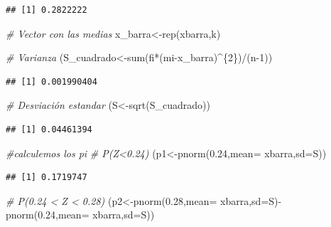 \documentclass{staprojteamusb}
\newenvironment{Shaded}{\begin{snugshade}}{\end{snugshade}}
\newcommand{\AttributeTok}[1]{\textcolor[rgb]{0.77,0.63,0.00}{#1}}
\newcommand{\CommentTok}[1]{\textcolor[rgb]{0.56,0.35,0.01}{\textit{#1}}}
\newcommand{\DecValTok}[1]{\textcolor[rgb]{0.00,0.00,0.81}{#1}}
\newcommand{\FloatTok}[1]{\textcolor[rgb]{0.00,0.00,0.81}{#1}}
\newcommand{\FunctionTok}[1]{\textcolor[rgb]{0.00,0.00,0.00}{#1}}
\newcommand{\NormalTok}[1]{#1}
\newcommand{\OtherTok}[1]{\textcolor[rgb]{0.56,0.35,0.01}{#1}}
\newcommand{\SpecialCharTok}[1]{\textcolor[rgb]{0.00,0.00,0.00}{#1}}
\begin{document}
\begin{verbatim}
## [1] 0.2822222
\end{verbatim}

\begin{Shaded}
\begin{Highlighting}[]
\CommentTok{\# Vector con las medias}
\NormalTok{x\_barra}\OtherTok{\textless{}{-}}\FunctionTok{rep}\NormalTok{(xbarra,k)}

\CommentTok{\# Varianza }
\NormalTok{(S\_cuadrado}\OtherTok{\textless{}{-}}\FunctionTok{sum}\NormalTok{(fi}\SpecialCharTok{*}\NormalTok{(mi}\SpecialCharTok{{-}}\NormalTok{x\_barra)}\SpecialCharTok{\^{}}\NormalTok{\{}\DecValTok{2}\NormalTok{\})}\SpecialCharTok{/}\NormalTok{(n}\DecValTok{{-}1}\NormalTok{))}
\end{Highlighting}
\end{Shaded}

\begin{verbatim}
## [1] 0.001990404
\end{verbatim}

\begin{Shaded}
\begin{Highlighting}[]
\CommentTok{\# Desviación estandar}
\NormalTok{(S}\OtherTok{\textless{}{-}}\FunctionTok{sqrt}\NormalTok{(S\_cuadrado))}
\end{Highlighting}
\end{Shaded}

\begin{verbatim}
## [1] 0.04461394
\end{verbatim}

\begin{Shaded}
\begin{Highlighting}[]
\CommentTok{\#calculemos los pi}
\CommentTok{\# P(Z\textless{}0.24)}
\NormalTok{(p1}\OtherTok{\textless{}{-}}\FunctionTok{pnorm}\NormalTok{(}\FloatTok{0.24}\NormalTok{,}\AttributeTok{mean=}\NormalTok{ xbarra,}\AttributeTok{sd=}\NormalTok{S))}
\end{Highlighting}
\end{Shaded}

\begin{verbatim}
## [1] 0.1719747
\end{verbatim}

\begin{Shaded}
\begin{Highlighting}[]
\CommentTok{\# P(0.24 \textless{} Z \textless{} 0.28) }
\NormalTok{(p2}\OtherTok{\textless{}{-}}\FunctionTok{pnorm}\NormalTok{(}\FloatTok{0.28}\NormalTok{,}\AttributeTok{mean=}\NormalTok{ xbarra,}\AttributeTok{sd=}\NormalTok{S)}\SpecialCharTok{{-}}\FunctionTok{pnorm}\NormalTok{(}\FloatTok{0.24}\NormalTok{,}\AttributeTok{mean=}\NormalTok{ xbarra,}\AttributeTok{sd=}\NormalTok{S))}
\end{Highlighting}
\end{Shaded}
\end{document}
